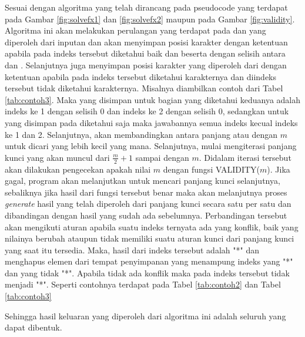 \indent Sesuai dengan algoritma yang telah dirancang pada pseudocode yang terdapat pada Gambar \ref{fig:solvefx1} dan \ref{fig:solvefx2} maupun pada Gambar \ref{fig:validity}. Algoritma ini akan melakukan perulangan yang terdapat pada \plaintext dan \ciphertext yang diperoleh dari inputan dan akan menyimpan posisi karakter dengan ketentuan apabila pada indeks tersebut diketahui baik \plaintext dan \ciphertext beserta dengan selisih antara \ciphertext dan \plaintext. Selanjutnya juga menyimpan posisi karakter yang diperoleh dari \ciphertext dengan ketentuan apabila \ciphertext pada indeks tersebut diketahui karakternya dan \plaintext diindeks tersebut tidak diketahui karakternya. Misalnya diambilkan contoh dari Tabel \ref{tab:contoh3}. Maka yang disimpan untuk bagian yang diketahui keduanya adalah indeks ke 1 dengan selisih 0 dan indeks ke 2 dengan selisih 0, sedangkan untuk yang disimpan pada diketahui \ciphertext saja maka jawabannya semua indeks kecual indeks ke 1 dan 2. Selanjutnya, akan membandingkan antara panjang \plaintext atau \ciphertext dengan $m$ untuk dicari yang lebih kecil yang mana. Selanjutnya, mulai mengiterasi panjang kunci yang akan muncul dari $\frac{m}{2}+1$ sampai dengan $m$. Didalam iterasi tersebut akan dilakukan pengecekan apakah nilai $m$ dengan fungsi VALIDITY($m$). Jika gagal, program akan melanjutkan untuk mencari panjang kunci selanjutnya, sebaliknya jika hasil dari fungsi tersebut benar maka akan melanjutnya proses \textit{generate} hasil yang telah diperoleh dari panjang kunci secara satu per satu dan dibandingan dengan hasil yang sudah ada sebelumnya. Perbandingan tersebut akan mengikuti aturan apabila suatu indeks ternyata ada yang konflik, baik yang nilainya berubah ataupun tidak memiliki suatu aturan kunci dari panjang kunci yang saat itu tersedia. Maka, hasil dari indeks tersebut adalah "*" dan menghapus elemen dari tempat penyimpanan yang menampung indeks \plaintext yang "*" dan \ciphertext yang tidak "*". Apabila tidak ada konflik maka \plaintext pada indeks tersebut tidak menjadi "*". Seperti contohnya terdapat pada Tabel \ref{tab:contoh2} dan Tabel \ref{tab:contoh3}  


\indent Sehingga hasil keluaran yang diperoleh dari algoritma ini adalah seluruh \plaintext yang dapat dibentuk.

